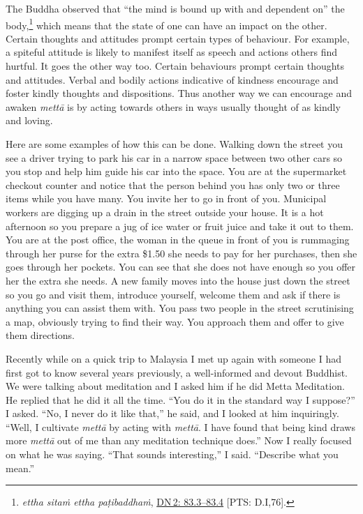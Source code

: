 \documentclass[10pt, openright]{book}
\begin{document}
The Buddha observed that “the mind is bound up with and dependent on” the body,\footnote {\textit{ettha sitaṁ ettha paṭibaddhaṁ}, \href{https://suttacentral.net/dn2/en/sujato\#83.3}{DN 2: 83.3–83.4} [PTS: D.I,76].} which means that the state of one can have an impact on the other. Certain thoughts and attitudes prompt certain types of behaviour. For example, a spiteful attitude is likely to manifest itself as speech and actions others find hurtful. It goes the other way too. Certain behaviours prompt certain thoughts and attitudes. Verbal and bodily actions indicative of kindness encourage and foster kindly thoughts and dispositions. Thus another way we can encourage and awaken \textit{mettā} is by acting towards others in ways usually thought of as kindly and loving.


Here are some examples of how this can be done. Walking down the street you see a driver trying to park his car in a narrow space between two other cars so you stop and help him guide his car into the space. You are at the supermarket checkout counter and notice that the person behind you has only two or three items while you have many. You invite her to go in front of you. Municipal workers are digging up a drain in the street outside your house. It is a hot afternoon so you prepare a jug of ice water or fruit juice and take it out to them. You are at the post office, the woman in the queue in front of you is rummaging through her purse for the extra \$1.50 she needs to pay for her purchases, then she goes through her pockets. You can see that she does not have enough so you offer her the extra she needs. A new family moves into the house just down the street so you go and visit them, introduce yourself, welcome them and ask if there is anything you can assist them with. You pass two people in the street scrutinising a map, obviously trying to find their way. You approach them and offer to give them directions.


Recently while on a quick trip to Malaysia I met up again with someone I had first got to know several years previously, a well-informed and devout Buddhist. We were talking about meditation and I asked him if he did Metta Meditation. He replied that he did it all the time. “You do it in the standard way I suppose?” I asked. “No, I never do it like that,” he said, and I looked at him inquiringly. “Well, I cultivate \textit{mettā} by acting with \textit{mettā}. I have found that being kind draws more \textit{mettā} out of me than any meditation technique does.” Now I really focused on what he was saying. “That sounds interesting,” I said. “Describe what you mean.”
\end{document}
